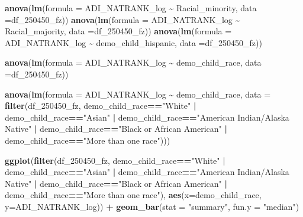 \documentclass[
]{article}
\newenvironment{Shaded}{\begin{snugshade}}{\end{snugshade}}
\newcommand{\AttributeTok}[1]{\textcolor[rgb]{0.13,0.29,0.53}{#1}}
\newcommand{\FunctionTok}[1]{\textcolor[rgb]{0.13,0.29,0.53}{\textbf{#1}}}
\newcommand{\NormalTok}[1]{#1}
\newcommand{\SpecialCharTok}[1]{\textcolor[rgb]{0.81,0.36,0.00}{\textbf{#1}}}
\newcommand{\StringTok}[1]{\textcolor[rgb]{0.31,0.60,0.02}{#1}}
\begin{document}
\begin{Shaded}
\begin{Highlighting}[]
\FunctionTok{anova}\NormalTok{(}\FunctionTok{lm}\NormalTok{(}\AttributeTok{formula =}\NormalTok{ ADI\_NATRANK\_log }\SpecialCharTok{\textasciitilde{}}\NormalTok{ Racial\_minority, }\AttributeTok{data =}\NormalTok{df\_250450\_fz))}
\FunctionTok{anova}\NormalTok{(}\FunctionTok{lm}\NormalTok{(}\AttributeTok{formula =}\NormalTok{ ADI\_NATRANK\_log }\SpecialCharTok{\textasciitilde{}}\NormalTok{ Racial\_majority, }\AttributeTok{data =}\NormalTok{df\_250450\_fz))}
\FunctionTok{anova}\NormalTok{(}\FunctionTok{lm}\NormalTok{(}\AttributeTok{formula =}\NormalTok{ ADI\_NATRANK\_log }\SpecialCharTok{\textasciitilde{}}\NormalTok{ demo\_child\_hispanic, }\AttributeTok{data =}\NormalTok{df\_250450\_fz))}

\FunctionTok{anova}\NormalTok{(}\FunctionTok{lm}\NormalTok{(}\AttributeTok{formula =}\NormalTok{ ADI\_NATRANK\_log }\SpecialCharTok{\textasciitilde{}}\NormalTok{ demo\_child\_race, }\AttributeTok{data =}\NormalTok{df\_250450\_fz))}

\FunctionTok{anova}\NormalTok{(}\FunctionTok{lm}\NormalTok{(}\AttributeTok{formula =}\NormalTok{ ADI\_NATRANK\_log }\SpecialCharTok{\textasciitilde{}}\NormalTok{ demo\_child\_race, }\AttributeTok{data =} \FunctionTok{filter}\NormalTok{(df\_250450\_fz, demo\_child\_race}\SpecialCharTok{==}\StringTok{"White"} \SpecialCharTok{|}
\NormalTok{              demo\_child\_race}\SpecialCharTok{==}\StringTok{"Asian"} \SpecialCharTok{|}
\NormalTok{              demo\_child\_race}\SpecialCharTok{==}\StringTok{"American Indian/Alaska Native"} \SpecialCharTok{|}
\NormalTok{              demo\_child\_race}\SpecialCharTok{==}\StringTok{"Black or African American"} \SpecialCharTok{|}
\NormalTok{              demo\_child\_race}\SpecialCharTok{==}\StringTok{"More than one race"}\NormalTok{)))}

\FunctionTok{ggplot}\NormalTok{(}\FunctionTok{filter}\NormalTok{(df\_250450\_fz, demo\_child\_race}\SpecialCharTok{==}\StringTok{"White"} \SpecialCharTok{|}
\NormalTok{              demo\_child\_race}\SpecialCharTok{==}\StringTok{"Asian"} \SpecialCharTok{|}
\NormalTok{              demo\_child\_race}\SpecialCharTok{==}\StringTok{"American Indian/Alaska Native"} \SpecialCharTok{|}
\NormalTok{              demo\_child\_race}\SpecialCharTok{==}\StringTok{"Black or African American"} \SpecialCharTok{|}
\NormalTok{              demo\_child\_race}\SpecialCharTok{==}\StringTok{"More than one race"}\NormalTok{), }\FunctionTok{aes}\NormalTok{(}\AttributeTok{x=}\NormalTok{demo\_child\_race, }\AttributeTok{y=}\NormalTok{ADI\_NATRANK\_log)) }\SpecialCharTok{+}
  \FunctionTok{geom\_bar}\NormalTok{(}\AttributeTok{stat =} \StringTok{"summary"}\NormalTok{, }\AttributeTok{fun.y =} \StringTok{"median"}\NormalTok{)}
\end{Highlighting}
\end{Shaded}
\end{document}
